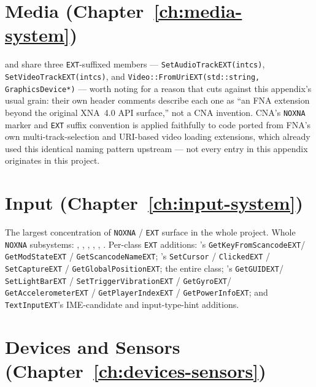 \section{Media (Chapter~\ref{ch:media-system})}

 and  share three \texttt{EXT}-suffixed members ---
\texttt{SetAudioTrackEXT(intcs)}, \texttt{SetVideoTrackEXT(intcs)}, and
\texttt{Video::FromUriEXT(std::string, GraphicsDevice*)} --- worth noting for a reason that
cuts against this appendix's usual grain: their own header comments describe each one as ``an
FNA extension beyond the original XNA~4.0 API surface,'' not a CNA invention. CNA's
\texttt{NOXNA} marker and \texttt{EXT} suffix convention is applied faithfully to code ported
from FNA's own multi-track-selection and URI-based video loading extensions, which already used
this identical naming pattern upstream --- not every entry in this appendix originates in this
project.

\section{Input (Chapter~\ref{ch:input-system})}

The largest concentration of \texttt{NOXNA} / \texttt{EXT} surface in the whole project. Whole
\texttt{NOXNA} subsystems: , ,
, , , . Per-class
\texttt{EXT} additions: 's \texttt{GetKeyFromScancodeEXT}/%
\texttt{GetModStateEXT} / \texttt{GetScancodeNameEXT}; 's
\texttt{SetCursor} / \texttt{ClickedEXT} / \texttt{SetCaptureEXT} / \texttt{GetGlobalPositionEXT};
the entire  class; 's \texttt{GetGUIDEXT}/%
\texttt{SetLightBarEXT} / \texttt{SetTriggerVibrationEXT} / \texttt{GetGyroEXT}/%
\texttt{GetAccelerometerEXT} / \texttt{GetPlayerIndexEXT} / \texttt{GetPowerInfoEXT}; and
\texttt{TextInputEXT}'s IME-candidate and input-type-hint additions.

\section{Devices and Sensors (Chapter~\ref{ch:devices-sensors})}

